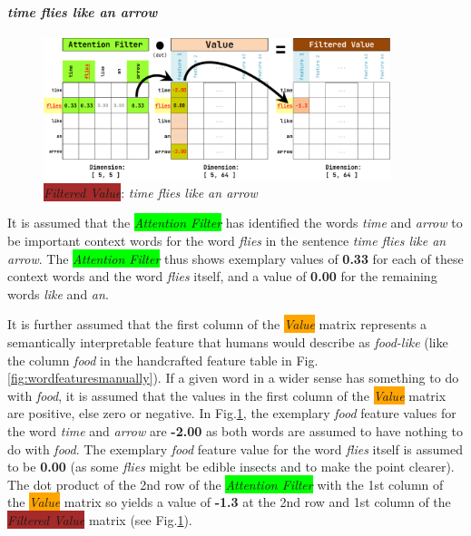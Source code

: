 \paragraph{\emph{time flies like an arrow}}

\begin{figure}[H]
	\centering
	\includegraphics[width=0.9\textwidth]{Assets/filteredvalues1}
	\caption{\colorbox{brown}{\emph{Filtered Value}}: \emph{time flies like an arrow}}
	\label{filteredvalues1}
\end{figure}

It is assumed that the \colorbox{lime}{\emph{Attention Filter}} has identified the words \emph{time} and \emph{arrow} to be important context words for the word \emph{flies} in the sentence \emph{time flies like an arrow}.
The \colorbox{lime}{\emph{Attention Filter}} thus shows exemplary values of \textbf{0.33} for each of these context words and the word \emph{flies} itself, and a value of \textbf{0.00} for the remaining words \emph{like} and \emph{an}.

It is further assumed that the first column of the \colorbox{orange}{\emph{Value}} matrix represents a semantically interpretable feature that humans would describe as \emph{food-like} (like the column \emph{food} in the handcrafted feature table in Fig.\ref{fig:wordfeaturesmanually}).
If a given word in a wider sense has something to do with \emph{food}, it is assumed that the values in the first column of the \colorbox{orange}{\emph{Value}} matrix are positive, else zero or negative.
In Fig.\ref{filteredvalues1}, the exemplary \emph{food} feature values for the word \emph{time} and \emph{arrow} are \textbf{-2.00} as both words are assumed to have nothing to do with \emph{food}.
The exemplary \emph{food} feature value for the word \emph{flies} itself is assumed to be \textbf{0.00} (as some \emph{flies} might be edible insects and to make the point clearer).
The dot product of the 2nd row of the \colorbox{lime}{\emph{Attention Filter}} with the 1st column of the \colorbox{orange}{\emph{Value}} matrix so yields a value of \textbf{-1.3} at the 2nd row and 1st column of the \colorbox{brown}{\emph{Filtered Value}} matrix (see Fig.\ref{filteredvalues1}).


